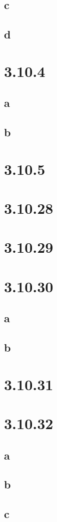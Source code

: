 \documentclass[12pt]{article}
\begin{document}
\subsection{c}

\subsection{d}

\section{3.10.4}

\subsection{a}

\subsection{b}

\section{3.10.5}

\section{3.10.28}

\section{3.10.29}

\section{3.10.30}

\subsection{a}

\subsection{b}

\section{3.10.31}

\section{3.10.32}

\subsection{a}

\subsection{b}

\subsection{c}
\end{document}
